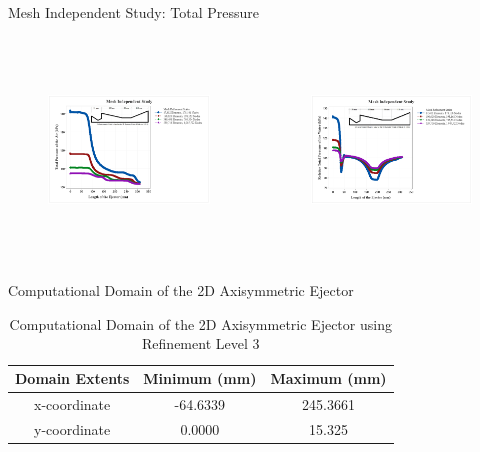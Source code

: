 \begin{frame}{Mesh Independent Study: Total Pressure}
       \begin{columns}
      \begin{figure}[h]
      \centering
      \includegraphics[height=4.5cm]{images/MISTPAir.png}
      \label{fig:meshindependentstudy}
      \end{figure}
      \begin{figure}[h]
      \centering
      \includegraphics[height=4.5cm]{images/MISRelTPwater.png}
      \label{fig:meshindependentstudy}
      \end{figure}
    \end{columns}
\end{frame}

\begin{frame}{Computational Domain of the 2D Axisymmetric Ejector}
    \begin{table}[h]
    \centering
    \caption{Computational Domain of the 2D Axisymmetric Ejector using Refinement Level 3}
    \label{tab:computationaldomainejector}
    \begin{tabular}{ccc}
    \hline
        Domain Extents & Minimum (mm) & Maximum (mm) \\
    \hline
        x-coordinate &  -64.6339 & 245.3661 \\
        y-coordinate & 0.0000 & 15.325 \\
    \hline
    \end{tabular}
\end{table}
\end{frame}

